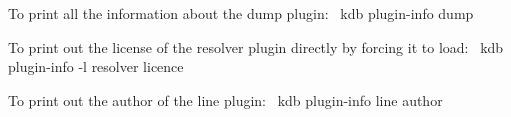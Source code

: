 To print all the information about the {\ttfamily dump} plugin\+:~\newline
 {\ttfamily kdb plugin-\/info dump}~\newline


To print out the license of the {\ttfamily resolver} plugin directly by forcing it to load\+:~\newline
 {\ttfamily kdb plugin-\/info -\/l resolver licence}~\newline


To print out the author of the {\ttfamily line} plugin\+:~\newline
 {\ttfamily kdb plugin-\/info line author}~\newline
 